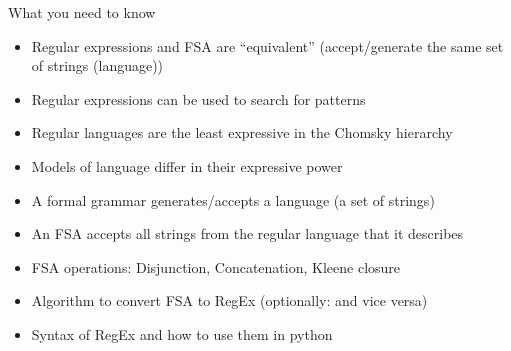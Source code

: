 \documentclass{beamer}
\begin{document}
\begin{frame}{What you need to know}
\begin{itemize}
\item Regular expressions and FSA are ``equivalent'' (accept/generate the same set of strings (language))
\item Regular expressions can be used to search for patterns
\item Regular languages are the least expressive in the Chomsky hierarchy
\item Models of language differ in their expressive power
\item A formal grammar generates/accepts a language (a set of strings)
\item An FSA accepts all strings from the regular language that it describes
\item FSA operations: Disjunction, Concatenation, Kleene closure
\item Algorithm to convert FSA to RegEx (optionally: and vice versa)
\item Syntax of RegEx and how to use them in python
\end{itemize}
\end{frame}
\end{document}
